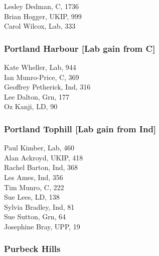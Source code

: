 \documentclass[a4paper,openany,10pt]{book}
\begin{document}


Lesley Dedman, C, 1736\\
Brian Hogger, UKIP, 999\\
Carol Wilcox, Lab, 333\\


\subsubsection*{Portland Harbour \hspace*{\fill}\nolinebreak[1]%
\enspace\hspace*{\fill}
[Lab gain from C]}



Kate Wheller, Lab, 944\\
Ian Munro-Price, C, 369\\
Geoffrey Petherick, Ind, 316\\
Lee Dalton, Grn, 177\\
Oz Kanji, LD, 90\\


\subsubsection*{Portland Tophill \hspace*{\fill}\nolinebreak[1]%
\enspace\hspace*{\fill}
[Lab gain from Ind]}



Paul Kimber, Lab, 460\\
Alan Ackroyd, UKIP, 418\\
Rachel Barton, Ind, 368\\
Les Ames, Ind, 356\\
Tim Munro, C, 222\\
Sue Lees, LD, 138\\
Sylvia Bradley, Ind, 81\\
Sue Sutton, Grn, 64\\
Josephine Bray, UPP, 19\\


\subsubsection*{Purbeck Hills}
\end{document}
